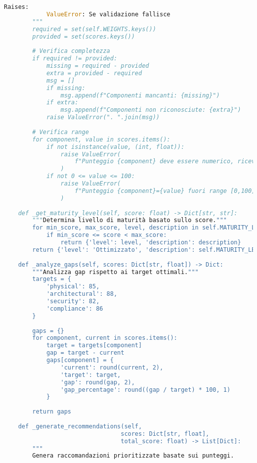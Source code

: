 \begin{lstlisting}[language=Python, caption={Implementazione completa GIST Calculator con validazione e reporting}]
        Raises:
            ValueError: Se validazione fallisce
        """
        required = set(self.WEIGHTS.keys())
        provided = set(scores.keys())
        
        # Verifica completezza
        if required != provided:
            missing = required - provided
            extra = provided - required
            msg = []
            if missing:
                msg.append(f"Componenti mancanti: {missing}")
            if extra:
                msg.append(f"Componenti non riconosciute: {extra}")
            raise ValueError(". ".join(msg))
        
        # Verifica range
        for component, value in scores.items():
            if not isinstance(value, (int, float)):
                raise ValueError(
                    f"Punteggio {component} deve essere numerico, ricevuto {type(value)}"
                )
            if not 0 <= value <= 100:
                raise ValueError(
                    f"Punteggio {component}={value} fuori range [0,100]"
                )
    
    def _get_maturity_level(self, score: float) -> Dict[str, str]:
        """Determina livello di maturità basato sullo score."""
        for min_score, max_score, level, description in self.MATURITY_LEVELS:
            if min_score <= score < max_score:
                return {'level': level, 'description': description}
        return {'level': 'Ottimizzato', 'description': self.MATURITY_LEVELS[-1][3]}
    
    def _analyze_gaps(self, scores: Dict[str, float]) -> Dict:
        """Analizza gap rispetto ai target ottimali."""
        targets = {
            'physical': 85,
            'architectural': 88,
            'security': 82,
            'compliance': 86
        }
        
        gaps = {}
        for component, current in scores.items():
            target = targets[component]
            gap = target - current
            gaps[component] = {
                'current': round(current, 2),
                'target': target,
                'gap': round(gap, 2),
                'gap_percentage': round((gap / target) * 100, 1)
            }
        
        return gaps
    
    def _generate_recommendations(self, 
                                 scores: Dict[str, float],
                                 total_score: float) -> List[Dict]:
        """
        Genera raccomandazioni prioritizzate basate sui punteggi.
        

\end{lstlisting}
